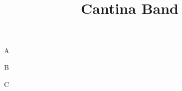 \documentclass[timestamp]{jazzgrid}
\title{\textbf{Cantina Band}}
\begin{document}
\maketitle
\begin{musicsection}{A}
\barline
	{\barfour{}
		{}
		{}
		{}
		{}
	}
	{\barfour{}
		{}
		{}
		{}
		{}
	}
	{\barfour{}
		{}
		{}
		{}
		{}
	}
	{\barfour{}
		{}
		{}
		{}
		{}
	}
\barline
	{\barfour{}
		{}
		{}
		{}
		{}
	}
	{\barfour{}
		{}
		{}
		{}
		{}
	}
	{\barfour{}
		{}
		{}
		{}
		{}
	}
	{\barfour{}
		{}
		{}
		{}
		{}
	}
\barline
	{\barfour{}
		{}
		{}
		{}
		{}
	}
	{\barfour{}
		{}
		{}
		{}
		{}
	}
	{\barfour{}
		{}
		{}
		{}
		{}
	}
	{\barfour{}
		{}
		{}
		{}
		{}
	}
\barline
	{\barfour{}
		{}
		{}
		{}
		{}
	}
	{\barfour{}
		{}
		{}
		{}
		{}
	}
	{\barfour{}
		{}
		{}
		{}
		{}
	}
	{\barfour{}
		{}
		{}
		{}
		{}
	}
\end{musicsection}

\begin{musicsection}{B}
\barline
	{\barfour{}
		{}
		{}
		{}
		{}
	}
	{\barfour{}
		{}
		{}
		{}
		{}
	}
	{\barfour{}
		{}
		{}
		{}
		{}
	}
	{\barfour{}
		{}
		{}
		{}
		{}
	}
\barline
	{\barfour{}
		{}
		{}
		{}
		{}
	}
	{\barfour{}
		{}
		{}
		{}
		{}
	}
	{\barfour{}
		{}
		{}
		{}
		{}
	}
	{\barfour{}
		{}
		{}
		{}
		{}
	}
\barline
	{\barfour{}
		{}
		{}
		{}
		{}
	}
	{\barfour{}
		{}
		{}
		{}
		{}
	}
	{\barfour{}
		{}
		{}
		{}
		{}
	}
	{\barfour{}
		{}
		{}
		{}
		{}
	}
\barline
	{\barfour{}
		{}
		{}
		{}
		{}
	}
	{\barfour{}
		{}
		{}
		{}
		{}
	}
	{\barfour{}
		{}
		{}
		{}
		{}
	}
	{\barfour{}
		{}
		{}
		{}
		{}
	}
\end{musicsection}
\begin{musicsection}{C}
\barline
	{\barfour{}
		{}
		{}
		{}
		{}
	}
	{\barfour{}
		{}
		{}
		{}
		{}
	}
	{\barfour{}
		{}
		{}
		{}
		{}
	}
	{\barfour{}
		{}
		{}
		{}
		{}
	}
\barline
	{\barfour{}
		{}
		{}
		{}
		{}
	}
	{\barfour{}
		{}
		{}
		{}
		{}
	}
	{\barfour{}
		{}
		{}
		{}
		{}
	}
	{\barfour{}
		{}
		{}
		{}
		{}
	}
\end{musicsection}
\end{document}
